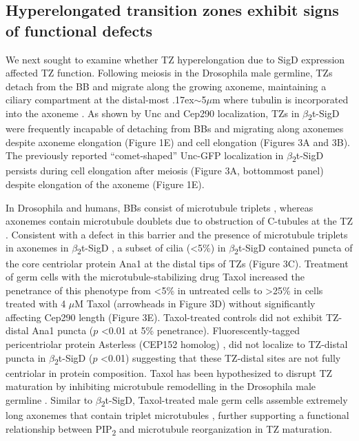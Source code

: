 \documentclass[12pt, twoside, letterpaper]{article}
\newcommand{\PIP}{PIP\textsubscript{2}}
\newcommand{\sigd}{$\beta$\textsubscript{2}t-SigD}
\begin{document}
\begin{doublespacing}
\begin{linenumbers}
    \subsection*{Hyperelongated transition zones exhibit signs of functional defects}
    We next sought to examine whether TZ hyperelongation due to SigD expression
    affected TZ function.
    Following meiosis in the Drosophila male germline, TZs detach from
    the BB and migrate along the growing axoneme, maintaining a ciliary compartment
    at the distal-most {\raise.17ex\hbox{$\scriptstyle\sim$}}5$\mu$m where tubulin
    is incorporated into the axoneme
    \citep{basiri2014migrating, fabian2012drosophila}.
    As shown by Unc and Cep290 localization,
    TZs in \sigd{} were frequently incapable of detaching from
    BBs and migrating along axonemes despite
    axoneme elongation (Figure 1E) and cell elongation
    (Figures 3A and 3B).
    The previously reported ``comet-shaped'' Unc-GFP localization in \sigd{}
    \citep{wei2008depletion}
    persists during cell elongation after meiosis
    (Figure 3A, bottommost panel)
    despite elongation of the axoneme (Figure 1E).

    In Drosophila and humans, BBs consist of microtubule triplets
    \citep{jana2016drosophila, lattao2017centrioles},
    whereas axonemes contain microtubule doublets due to obstruction of
    C-tubules at the TZ \citep{gottardo2013cilium}.
    Consistent with a defect in this barrier and the presence of
    microtubule triplets in axonemes in \sigd{} \citep{wei2008depletion},
    a subset of cilia (<5\%) in \sigd{}
    contained puncta of the core centriolar protein Ana1 at the distal
    tips of TZs (Figure 3C).
    Treatment of germ cells with the microtubule-stabilizing drug
    Taxol increased the penetrance of this phenotype from <5\% in untreated cells
    to \textgreater25\% in cells treated with 4 $\mu$M Taxol (arrowheads in Figure 3D)
    without significantly affecting Cep290 length (Figure 3E).
    Taxol-treated controls did not exhibit TZ-distal Ana1 puncta ($p$ <0.01 at 5\% penetrance).
    Fluorescently-tagged pericentriolar protein Asterless (CEP152 homolog)
    \citep{blachon2008drosophila, dzhindzhev2010asterless},
    did not localize to TZ-distal puncta in \sigd{} ($p$ <0.01)
    suggesting that these TZ-distal
    sites are not fully centriolar in protein composition.
    Taxol has been hypothesized to disrupt TZ maturation
    by inhibiting microtubule remodelling in the Drosophila male germline \citep{riparbelli2012assembly, riparbelli2013unique}.
    Similar to \sigd{},
    Taxol-treated male germ cells assemble extremely long axonemes
    that contain triplet microtubules
    \citep{riparbelli2013unique}, further supporting a functional relationship between
    \PIP{} and microtubule reorganization in TZ maturation.


\end{linenumbers}
\end{doublespacing}
\end{document}
